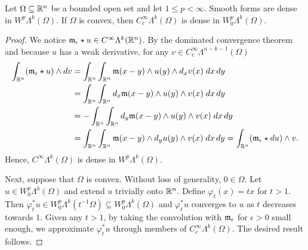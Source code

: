 \documentclass[10pt,a4paper]{article}
\begin{document}
\begin{lemma}
    Let $\Omega \subseteq {\mathbb R}^{n}$ be a bounded open set and let $1 \leq p < \infty$. 
    Smooth forms are dense in $W^{p}\Lambda^{k}(\Omega)$.
    If $\Omega$ is convex, then $C^{\infty}_{c}\Lambda^{k}(\Omega)$ is dense in $W^{p}_{0}\Lambda^{k}(\Omega)$. 
\end{lemma}
\begin{proof}
    We notice ${\mathfrak m}_{\epsilon} \star u \in C^{\infty}\Lambda^{k}({\mathbb R}^{n})$. 
    By the dominated convergence theorem and because $u$ has a weak derivative,
    for any $v \in C^{\infty}_{c}\Lambda^{n-k-1}(\Omega)$
    \begin{align*}
        \int_{{\mathbb R}^{n}} ( {\mathfrak m}_{\epsilon} \star u ) \wedge d v 
        &= 
        \int_{{\mathbb R}^{n}} \int_{{\mathbb R}^{n}} {\mathfrak m}(x-y) \wedge u(y) \wedge d_{x} v(x) \;dx\,dy
        \\&= 
        \int_{{\mathbb R}^{n}} \int_{{\mathbb R}^{n}} d_x{\mathfrak m}(x-y) \wedge u(y) \wedge v(x) \;dx\,dy
        \\&= 
        - \int_{{\mathbb R}^{n}} \int_{{\mathbb R}^{n}} d_y{\mathfrak m}(x-y) \wedge u(y) \wedge v(x) \;dx\,dy
        \\&= 
        \int_{{\mathbb R}^{n}} \int_{{\mathbb R}^{n}} {\mathfrak m}(x-y) \wedge d_y u(y) \wedge v(x) \;dx\,dy
        = 
        \int_{{\mathbb R}^{n}} ( {\mathfrak m}_{\epsilon} \star d u ) \wedge v 
        .
    \end{align*}
    Hence, $C^{\infty}\Lambda^{k}(\Omega)$ is dense in $W^{p}\Lambda^{k}(\Omega)$.
    
    Next, suppose that $\Omega$ is convex. Without loss of generality, $0 \in \Omega$. 
    Let $u \in W^{p}_{0}\Lambda^{k}(\Omega)$ and extend $u$ trivially onto ${\mathbb R}^{n}$. 
    Define $\varphi_t(x) = tx$ for $t > 1$. 
    Then $\varphi_{t}^{\ast} u \in W^{p}_{0}\Lambda^{k}(t^{-1}\Omega) \subseteq W^{p}_{0}\Lambda^{k}(\Omega)$ 
    and $\varphi_{t}^{\ast} u$ converges to $u$ as $t$ decreases towards $1$. 
    Given any $t > 1$, by taking the convolution with ${\mathfrak m}_{\epsilon}$ for $\epsilon > 0$ small enough,
    we approximate $\varphi_{t}^{\ast} u$ through members of $C^{\infty}_{c}\Lambda^{k}(\Omega)$.
    The desired result follows. 
\end{proof}
\end{document}
